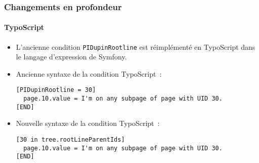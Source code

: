 \begin{frame}[fragile]
	\frametitle{Changements en profondeur}
	\framesubtitle{TypoScript}

	\lstset{basicstyle=\smaller\ttfamily}

	\begin{itemize}
		\item L'ancienne condition \texttt{PIDupinRootline} est réimplémenté
			en TypoScript dans le langage d'expression de Symfony.
		\item Ancienne syntaxe de la condition TypoScript~:

\vspace{-0.4cm}
\begin{lstlisting}
[PIDupinRootline = 30]
  page.10.value = I'm on any subpage of page with UID 30.
[END]
\end{lstlisting}

		\item Nouvelle syntaxe de la condition TypoScript~:
\begin{lstlisting}
[30 in tree.rootLineParentIds]
  page.10.value = I'm on any subpage of page with UID 30.
[END]
\end{lstlisting}

	\end{itemize}

\end{frame}



